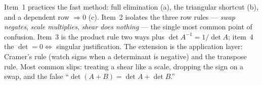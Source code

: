 \documentclass[10pt]{article}
\begin{document}
\begin{teachernote}
Item~1 practices the fast method: full elimination (a), the triangular shortcut (b), and a dependent
row $\Rightarrow0$ (c). Item~2 isolates the three row rules --- \emph{swap negates}, \emph{scale
multiplies}, \emph{shear does nothing} --- the single most common point of confusion. Item~3 is the
product rule two ways plus $\det A^{-1}=1/\det A$; item~4 the $\det=0\Leftrightarrow$ singular
justification. The extension is the application layer: Cramer's rule (watch signs when a determinant is
negative) and the transpose rule. Most common slips: treating a shear like a scale, dropping the sign
on a swap, and the false ``$\det(A+B)=\det A+\det B$.''
\end{teachernote}
\end{document}
